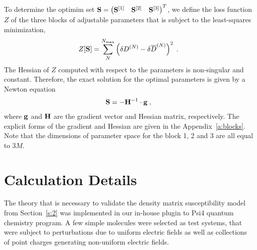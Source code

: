 \documentclass[aip,amsmath,amssymb,reprint]{revtex4-1}
\begin{document}
To determine the optimim set 
$
 {\bf S} = 
\begin{pmatrix}
{\bf S}^{[1]} &
{\bf S}^{[2]} &
{\bf S}^{[3]}
\end{pmatrix}^T
$, we define the loss function $Z$ 
of the three blocks of adjustable parameters
that is subject to the least\hyp{}squares minimization,
%
\begin{equation}\label{e:Z}
 Z[{\bf S}] = \sum_N^{N_{\rm max}} \left( \delta D^{(N)} - \delta \overline{D}^{(N)} \right)^2 \;.
\end{equation}
%
The Hessian of $Z$ computed with respect to the parameters is non\hyp{}singular 
and constant.
Therefore, the exact solution for the optimal parameters is given by a Newton equation
%
\begin{equation}\label{e:Newton}
 {\bf S} = -{\bf H}^{-1} \cdot {\bf g} \;,
\end{equation}
%
where ${\bf g}$ and ${\bf H}$ are the gradient vector and Hessian matrix, respectively.
%
%
The explicit forms of the gradient and Hessian are given in the Appendix~\ref{a:blocks}.
Note that the dimensions of parameter space for the block 1, 2 and 3 are all
equal to $3M$.

\section{\label{s:3}Calculation Details}

The theory that is necessary to validate the density matrix susceptibility model from Section~\ref{s:2}
was implemented in our in\hyp{}house plugin to Psi4 quantum chemistry program.
A few simple molecules were selected as test systems, that were subject to 
perturbations due to uniform electric fields as well as collections of point charges
generating non\hyp{}uniform electric fields. 
\end{document}
